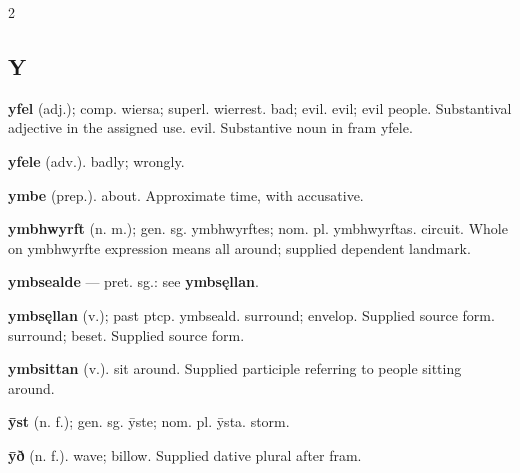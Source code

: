 \begin{multicols*}{2}
\subsection*{Y}
\textbf{yfel} (adj.); comp. wiersa; superl. wierrest. bad; evil. evil; evil people. Substantival adjective in the assigned use. evil. Substantive noun in fram yfele.\par
\textbf{yfele} (adv.). badly; wrongly.\par
\textbf{ymbe} (prep.). about. Approximate time, with accusative.\par
\textbf{ymbhwyrft} (n. m.); gen. sg. ymbhwyrftes; nom. pl. ymbhwyrftas. circuit. Whole on ymbhwyrfte expression means all around; supplied dependent landmark.\par
\textbf{ymbsealde} — pret. sg.: see \textbf{ymbsęllan}.\par
\textbf{ymbsęllan} (v.); past ptcp. ymbseald. surround; envelop. Supplied source form. surround; beset. Supplied source form.\par
\textbf{ymbsittan} (v.). sit around. Supplied participle referring to people sitting around.\par
\textbf{ȳst} (n. f.); gen. sg. ȳste; nom. pl. ȳsta. storm.\par
\textbf{ȳð} (n. f.). wave; billow. Supplied dative plural after fram.\par
\end{multicols*}
\clearpage
{}

